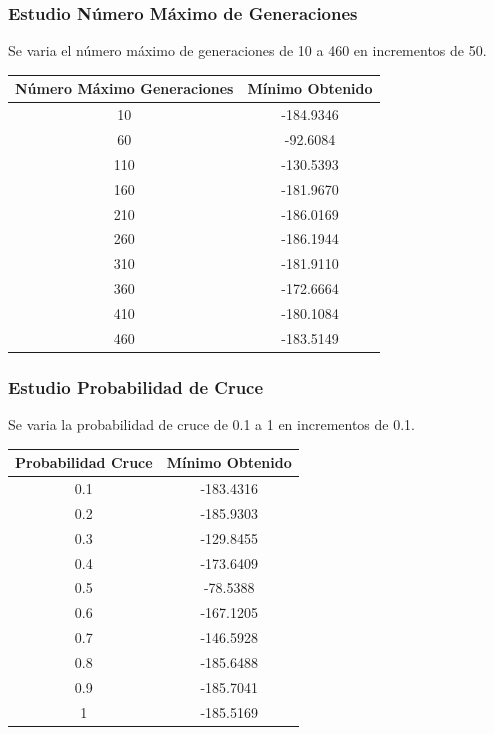 \documentclass[12pt]{article}
\begin{document}
\subsubsection*{Estudio Número Máximo de Generaciones}
	Se varia el número máximo de generaciones de 10 a 460 en incrementos de 50.
\begin{table}[H]
\begin{center}
\begin{tabular}{|cc|} \hline
Número Máximo Generaciones & Mínimo Obtenido \\  \hline
10  & -184.9346 \\ 
60  & -92.6084 \\ 
110 & -130.5393 \\
160 & -181.9670 \\
210 & -186.0169 \\
260 & -186.1944 \\
310 & -181.9110 \\
360 & -172.6664 \\ 
410 & -180.1084 \\
460 & -183.5149 \\  \hline
\end{tabular}
\end{center}
\end{table}
\subsubsection*{Estudio Probabilidad de Cruce}
	Se varia la probabilidad de cruce de 0.1 a 1 en incrementos de 0.1.
\begin{table}[H]
\begin{center}
\begin{tabular}{|cc|} \hline
Probabilidad Cruce & Mínimo Obtenido \\  \hline
0.1 & -183.4316 \\ 
0.2 & -185.9303 \\ 
0.3 & -129.8455 \\
0.4 & -173.6409 \\
0.5 & -78.5388 \\
0.6 & -167.1205 \\
0.7 & -146.5928 \\
0.8 & -185.6488 \\ 
0.9 & -185.7041 \\
1   & -185.5169 \\  \hline
\end{tabular}
\end{center}
\end{table}
\end{document}
